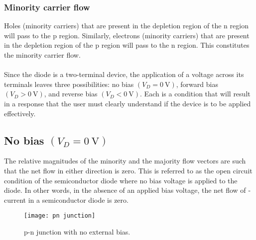 \subsubsection{Minority carrier flow}
Holes (minority carriers) that are present in the depletion region of the n region will pass to the p region. Similarly, electrons (minority carriers) that are present in the depletion region of the p region will pass to the n region. This constitutes the minority carrier flow.\\\\
Since the diode is a two-terminal device, the application of a voltage across its terminals leaves three possibilities: no bias $\left(V_{D}=0 \mathrm{~V}\right)$, forward bias $\left(V_{D}>0 \mathrm{~V}\right)$, and reverse bias $\left(V_{D}<0 \mathrm{~V}\right)$. Each is a condition that will result in a response that the user must clearly understand if the device is to be applied effectively.
\subsection{No bias $\left(V_{D}=0 \mathrm{~V}\right)$}
The relative magnitudes of the minority and the majority flow vectors are such that the net flow in either direction is zero. This is referred to as the open circuit condition of the semiconductor diode where no bias ­voltage is applied to the diode. In other words, in the absence of an applied bias voltage, the net flow of ­current in a semiconductor diode is zero.
\begin{figure}[H]
	\centering
	\texttt{[image: pn junction]}
	\caption{p-n junction with
		no external bias.}
	\label{No bias}
\end{figure}
